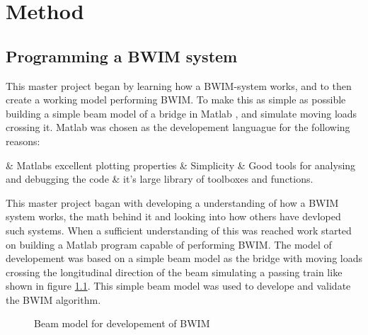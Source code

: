 \chapter{Method}

\section{Programming a BWIM system}
This master project began by learning how a BWIM-system works, and to then create a working model performing BWIM. To make this as simple as possible building a simple beam model of a bridge in Matlab \cite{MATLAB:2015}, and simulate moving loads crossing it.
Matlab was chosen as the developement languague for the following reasons:
\begin{easylist}[itemize]
	& Matlabs excellent plotting properties
	& Simplicity
	& Good tools for analysing and debugging the code
	& it's large library of toolboxes and functions.
\end{easylist}

This master project bagan with developing a understanding of how a BWIM system works, the math behind it and looking into how others have devloped such systems. When a sufficient understanding of this was reached work started on building a Matlab program capable of performing BWIM. The model of developement was based on a simple beam model as the bridge with moving loads crossing the longitudinal direction of the beam simulating a passing train like shown in figure \ref{figure:beam_model}.
This simple beam model was used to develope and validate the BWIM algorithm.
\begin{figure}[htpb]
	\centering
	\caption{Beam model for developement of BWIM}
	\label{figure:beam_model}
\end{figure}

